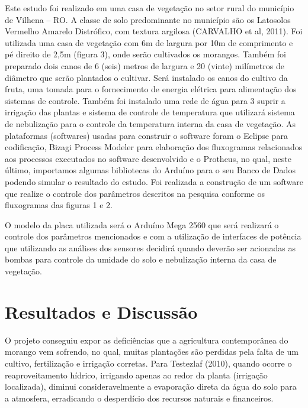 \documentclass[article,12pt,onesidea,4paper,english,brazil]{abntex2}
\begin{document}
	Este estudo foi realizado em uma casa de vegetação no setor rural do município de Vilhena – RO. A classe de solo predominante no município são os Latosolos Vermelho Amarelo Distrófico, com textura argilosa (CARVALHO et al, 2011). Foi utilizada uma casa de vegetação com 6m de largura por 10m de comprimento e pé direito de 2,5m (figura 3), onde serão cultivados os morangos. Também foi preparado dois canos de 6 (seis) metros de largura e 20 (vinte) milímetros de diâmetro que serão plantados o cultivar. Será instalado os canos do cultivo da fruta, uma tomada para o fornecimento de energia elétrica para alimentação dos sistemas de controle. Também foi instalado uma rede de água para
	3
	suprir a irrigação das plantas e sistema de controle de temperatura que utilizará sistema de nebulização para o controle da temperatura interna da casa de vegetação.
	As plataformas (softwares) usadas para construir o software foram o Eclipse para codificação, Bizagi Process Modeler para elaboração dos fluxogramas relacionados aos processos executados no software desenvolvido e o Protheus, no qual, neste último, importamos algumas bibliotecas do Arduíno para o seu Banco de Dados podendo simular o resultado do estudo.
	Foi realizada a construção de um software que realize o controle dos parâmetros descritos na pesquisa conforme os fluxogramas das figuras 1 e 2.
	
	O modelo da placa utilizada será o Arduíno Mega 2560 que será realizará o controle dos parâmetros mencionados e com a utilização de interfaces de potência que utilizando as análises dos sensores decidirá quando deverão ser acionadas as bombas para controle da umidade do solo e nebulização interna da casa de vegetação.
		
	
	
	\section*{Resultados e Discussão}
	
	O projeto conseguiu expor as deficiências que a agricultura contemporânea do morango vem sofrendo, no qual, muitas plantações são perdidas pela falta de um cultivo, fertilização e irrigação corretas. Para Testezlaf (2010), quando ocorre o reaproveitamento hídrico, irrigando apenas ao redor da planta (irrigação localizada), diminui consideravelmente a evaporação direta da água do solo para a atmosfera, erradicando o desperdício dos recursos naturais e financeiros.
	
\end{document}

